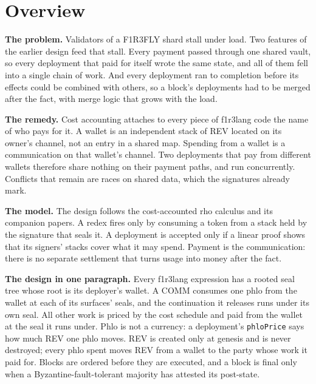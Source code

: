 \documentclass[10.5pt]{article}
\newcommand{\code}[1]{\texttt{#1}}
\begin{document}
\newpage
\section{Overview}\label{sec:overview}

\textbf{The problem.} Validators of a F1R3FLY shard stall under load. Two features of the earlier design feed that stall. Every payment passed through one shared vault, so every deployment that paid for itself wrote the same state, and all of them fell into a single chain of work. And every deployment ran to completion before its effects could be combined with others, so a block's deployments had to be merged after the fact, with merge logic that grows with the load.

\textbf{The remedy.} Cost accounting attaches to every piece of f1r3lang code the name of who pays for it. A wallet is an independent stack of REV located on its owner's channel, not an entry in a shared map. Spending from a wallet is a communication on that wallet's channel. Two deployments that pay from different wallets therefore share nothing on their payment paths, and run concurrently. Conflicts that remain are races on shared data, which the signatures already mark.

\textbf{The model.} The design follows the cost-accounted rho calculus and its companion papers. A redex fires only by consuming a token from a stack held by the signature that seals it. A deployment is accepted only if a linear proof shows that its signers' stacks cover what it may spend. Payment is the communication: there is no separate settlement that turns usage into money after the fact.

\begin{keypoint}
\textbf{The design in one paragraph.} Every f1r3lang expression has a rooted seal tree whose root is its deployer's wallet. A COMM consumes one phlo from the wallet at each of its surfaces' seals, and the continuation it releases runs under its own seal. All other work is priced by the cost schedule and paid from the wallet at the seal it runs under. Phlo is not a currency: a deployment's \code{phloPrice} says how much REV one phlo moves. REV is created only at genesis and is never destroyed; every phlo spent moves REV from a wallet to the party whose work it paid for. Blocks are ordered before they are executed, and a block is final only when a Byzantine-fault-tolerant majority has attested its post-state.
\end{keypoint}
\end{document}
